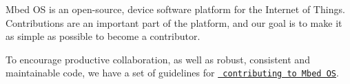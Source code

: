Mbed OS is an open-\/source, device software platform for the Internet of Things. Contributions are an important part of the platform, and our goal is to make it as simple as possible to become a contributor.

To encourage productive collaboration, as well as robust, consistent and maintainable code, we have a set of guidelines for \href{https://os.mbed.com/docs/mbed-os/latest/contributing/index.html}{\texttt{ contributing to Mbed OS}}. 